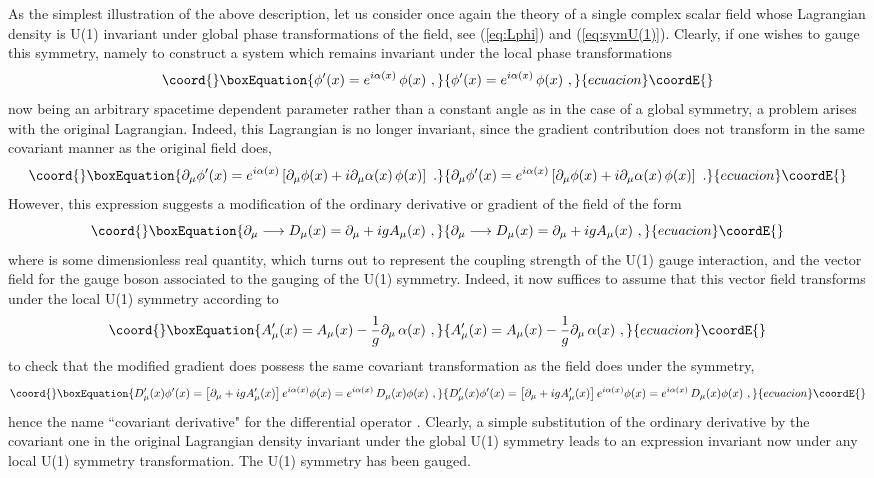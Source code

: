 \documentclass[a4paper,11pt]{article}
\begin{document}
As the simplest illustration of the above description, let us consider
once again the theory of a single complex scalar field \myHighlight{$\phi$}\coordHE{} whose
Lagrangian density is U(1) invariant under global phase transformations
of the field, see (\ref{eq:Lphi}) and (\ref{eq:symU(1)}). Clearly,
if one wishes to gauge this symmetry, namely to construct a
system which remains invariant under the local phase transformations
\begin{equation}\coord{}\boxEquation{
\phi'(x)=e^{i\alpha(x)}\,\phi(x)\ ,
}{
\phi'(x)=e^{i\alpha(x)}\,\phi(x)\ ,
}{ecuacion}\coordE{}\end{equation}
\coordHE{} now being an arbitrary spacetime dependent parameter rather
than a constant angle as in the case of a global symmetry, a problem
arises with the original Lagrangian. Indeed, this Lagrangian is no longer
invariant, since the gradient contribution does not transform in
the same covariant manner as the original field does,
\begin{equation}\coord{}\boxEquation{
\partial_\mu\phi'(x)=e^{i\alpha(x)}\left[\partial_\mu\phi(x)+
i\partial_\mu\alpha(x)\,\phi(x)\right]\ .
}{
\partial_\mu\phi'(x)=e^{i\alpha(x)}\left[\partial_\mu\phi(x)+
i\partial_\mu\alpha(x)\,\phi(x)\right]\ .
}{ecuacion}\coordE{}\end{equation}
However, this expression suggests a modification of the ordinary derivative
or gradient of the field of the form
\begin{equation}\coord{}\boxEquation{
\partial_\mu\longrightarrow D_\mu(x)=\partial_\mu+igA_\mu(x)\ ,
}{
\partial_\mu\longrightarrow D_\mu(x)=\partial_\mu+igA_\mu(x)\ ,
}{ecuacion}\coordE{}\end{equation}
where \coordHE{} is some dimensionless real quantity, which turns out to represent
the coupling strength of the U(1) gauge interaction, and \coordHE{} the vector
field for the gauge boson associated to the gauging of the U(1) symmetry.
Indeed, it now suffices to assume that this vector field transforms under
the local U(1) symmetry according to
\begin{equation}\coord{}\boxEquation{
A'_\mu(x)=A_\mu(x)-\frac{1}{g}\partial_\mu\,\alpha(x)\ ,
}{
A'_\mu(x)=A_\mu(x)-\frac{1}{g}\partial_\mu\,\alpha(x)\ ,
}{ecuacion}\coordE{}\end{equation}
to check that the modified gradient does possess the same covariant 
transformation as the field does under the symmetry,
\begin{equation}\coord{}\boxEquation{
D'_\mu(x)\phi'(x)=
\left[\partial_\mu+igA'_\mu(x)\right]e^{i\alpha(x)}\phi(x)=
e^{i\alpha(x)}\,D_\mu(x)\phi(x)\ ,
}{
D'_\mu(x)\phi'(x)=
\left[\partial_\mu+igA'_\mu(x)\right]e^{i\alpha(x)}\phi(x)=
e^{i\alpha(x)}\,D_\mu(x)\phi(x)\ ,
}{ecuacion}\coordE{}\end{equation}
hence the name ``covariant derivative" for the differential operator 
\coordHE{}. Clearly, a simple substitution of the ordinary derivative
by the covariant one in the original Lagrangian density invariant under
the global U(1) symmetry leads to an expression invariant now under any
local U(1) symmetry transformation. The U(1) symmetry has been gauged.
\end{document}
